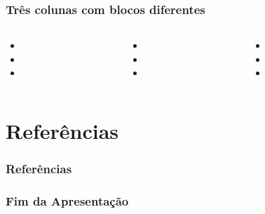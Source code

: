 \documentclass[aspectratio=169]{beamer}
\begin{document}
\begin{frame}[fragile] \frametitle{Três colunas com blocos diferentes}
\begin{columns}[t]
\begin{column}{0.32\linewidth}
\begin{block}{\lipsum[4][2]}
\begin{itemize} \itemsep1em
 \item \lipsum[4][1]
 \item \lipsum[4][3]
 \item \lipsum[4][4]
\end{itemize}
\end{block}
\end{column}
\begin{column}{0.32\linewidth}
\begin{alertblock}{\lipsum[4][9]}
\begin{itemize} \itemsep1em
 \item \lipsum[4][10]
 \item \lipsum[4][11]
 \item \lipsum[4][12]
\end{itemize}
\end{alertblock}
\end{column}
\begin{column}{0.32\linewidth}
\begin{exampleblock}{\lipsum[4][5]}
\begin{itemize} \itemsep1em
 \item \lipsum[4][6]
 \item \lipsum[4][7]
 \item \lipsum[4][8]
\end{itemize}
\end{exampleblock}
\end{column}
\end{columns}
\end{frame}

\section{Referências}

\begin{frame}[fragile] \frametitle{Referências}
  \printbibliography
\end{frame}

\begin{frame} \frametitle{Fim da Apresentação}
\begin{center}
  \vfill
  \lipsum[3][20]
  \vfill
\end{center}
\end{frame}
\end{document}
